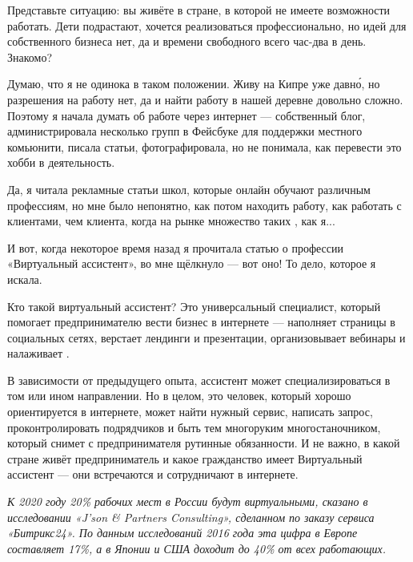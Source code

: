 Представьте ситуацию: вы живёте в стране, в которой не имеете возможности работать. Дети подрастают, хочется реализоваться профессионально, но идей для собственного бизнеса нет, да и времени свободного всего час-два в день. Знакомо?

Думаю, что я не одинока в таком положении. Живу на Кипре уже давн\'{о}, но разрешения на работу нет, да и найти работу в нашей деревне довольно сложно. Поэтому я начала думать об  работе через интернет ---  собственный блог, администрировала несколько групп в Фейсбуке для поддержки местного комьюнити, писала статьи, фотографировала, но не понимала, как перевести это хобби в  деятельность.

Да, я читала рекламные статьи школ, которые онлайн обучают различным профессиям, но мне было непонятно, как потом находить работу, как работать с клиентами, чем  клиента, когда на рынке множество таких , как я...

И вот, когда некоторое время назад я прочитала статью о профессии «Виртуальный ассистент», во мне щёлкнуло --- вот оно! То дело, которое я искала.

Кто такой виртуальный ассистент? Это универсальный специалист, который помогает предпринимателю вести бизнес в интернете --- наполняет страницы в социальных сетях, верстает лендинги и презентации, организовывает вебинары и налаживает .

В зависимости от предыдущего опыта, ассистент может специализироваться в том или ином направлении. Но в целом, это человек, который хорошо ориентируется в интернете, может найти нужный сервис, написать запрос, проконтролировать подрядчиков и быть тем многоруким многостаночником, который снимет с предпринимателя рутинные обязанности. И не важно, в какой стране живёт предприниматель и какое гражданство имеет Виртуальный ассистент --- они встречаются и сотрудничают в интернете.

{\it К 2020 году 20\% рабочих мест в России будут виртуальными, сказано в исследовании «J’son \& Partners Consulting», сделанном по заказу сервиса «Битрикс24». По данным исследований 2016 года эта цифра в Европе составляет 17\%, а в Японии и США доходит до 40\% от всех работающих.}


